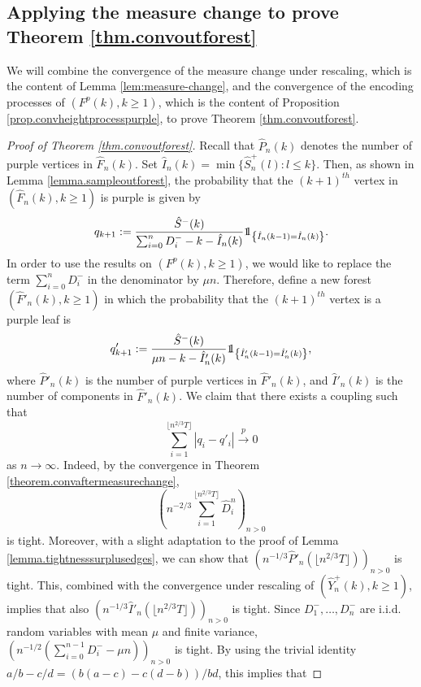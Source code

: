 \subsection{Applying the measure change to prove Theorem \ref{thm.convoutforest}}\label{subsubsec.convaftermeasurechange}

We will combine the convergence of the measure change under rescaling, which is the content of Lemma \ref{lem:measure-change}, and the convergence of the encoding processes of $(F^p(k),k\geq 1)$, which is the content of Proposition \ref{prop.convheightprocesspurple}, to prove Theorem \ref{thm.convoutforest}.

\begin{proof}[Proof of Theorem \ref{thm.convoutforest}]
Recall that $\hat{P}_n(k)$ denotes the number of purple vertices in $\hat{F}_n(k)$. Set $\hat{I}_n(k)=\min\{\hat{S}^{+}_n(l):l\leq k\}$. Then, as shown in Lemma \ref{lemma.sampleoutforest}, the probability that the $(k+1)^{th}$ vertex in $(\hat{F}_n(k),k\geq 1)$ is purple is given by
$$q_{k+1}:=\frac{\hat{S}^-(k)}{\sum_{i=0}^n D^-_i-k-\hat{I}_n(k)}\one_{\left\{\hat{I}_n(k-1)= \hat{I}_n(k)\right\}}.$$
In order to use the results on $(F^p(k),k\geq 1)$, we would like to replace the term $\sum_{i=0}^n D^-_i$ in the denominator by $\mu n$. Therefore, define a new forest $(\hat{F}'_n(k), k\geq 1)$ in which the probability that the $(k+1)^{th}$ vertex is a purple leaf is
$${q}'_{k+1}:=\frac{\hat{S}^-(k)}{\mu n-k-\hat{I}'_n(k)}\one_{\left\{\hat{I}'_n(k-1)=\hat{I}'_n(k)\right\}},$$
where $\hat{P}'_n(k)$ is the number of purple vertices in $\hat{F}'_n(k)$, and $\hat{I}'_n(k)$ is the number of components in $\hat{F}'_n(k)$. 
We claim that there exists a coupling such that
$$\sum_{i=1}^{\lfloor n^{2/3}T\rfloor }|q_i-q'_i|\overset{p}{\to}0$$
as $n\to \infty$. 
Indeed, by the convergence in Theorem \ref{theorem.convaftermeasurechange}, 
$$\left(n^{-2/3}\sum_{i=1}^{\lfloor n^{2/3}T\rfloor} \hat{D}^n_i\right)_{n>0}$$ is tight. Moreover, with a slight adaptation to the proof of Lemma \ref{lemma.tightnesssurplusedges}, we can show that $\left(n^{-1/3}\hat{P}'_n\left(\lfloor n^{2/3}T\rfloor \right)\right)_{n>0}$ is tight. This, combined with the convergence under rescaling of $(\hat{Y}^+_n(k),k\geq 1)$, implies that also $\left(n^{-1/3}\hat{I}'_n\left(\lfloor n^{2/3}T\rfloor \right)\right)_{n>0}$ is tight.  Since $D^-_1,\dots,D^-_n$ are i.i.d. random variables with mean $\mu$ and finite variance,
$\left(n^{-1/2}\left(\sum_{i=0}^{n-1}D^-_i-\mu n\right)\right)_{n>0}$ is tight. By using the trivial identity $a/b-c/d=(b(a-c)-c(d-b))/bd$, this implies that

\end{proof}
